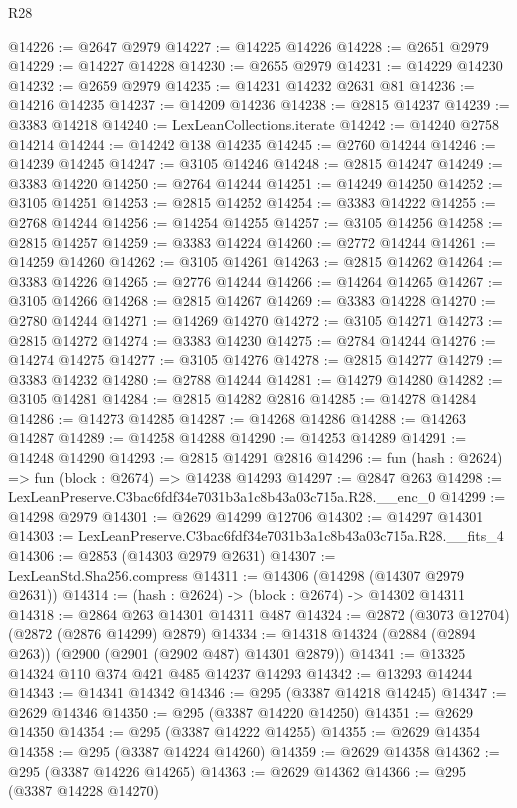 \begin{lexlean}{R28}
\begin{coremodule}
@14226 := @2647 @2979
@14227 := @14225 @14226
@14228 := @2651 @2979
@14229 := @14227 @14228
@14230 := @2655 @2979
@14231 := @14229 @14230
@14232 := @2659 @2979
@14235 := @14231 @14232 @2631 @81
@14236 := @14216 @14235
@14237 := @14209 @14236
@14238 := @2815 @14237
@14239 := @3383 @14218
@14240 := LexLeanCollections.iterate
@14242 := @14240 @2758 @14214
@14244 := @14242 @138 @14235
@14245 := @2760 @14244
@14246 := @14239 @14245
@14247 := @3105 @14246
@14248 := @2815 @14247
@14249 := @3383 @14220
@14250 := @2764 @14244
@14251 := @14249 @14250
@14252 := @3105 @14251
@14253 := @2815 @14252
@14254 := @3383 @14222
@14255 := @2768 @14244
@14256 := @14254 @14255
@14257 := @3105 @14256
@14258 := @2815 @14257
@14259 := @3383 @14224
@14260 := @2772 @14244
@14261 := @14259 @14260
@14262 := @3105 @14261
@14263 := @2815 @14262
@14264 := @3383 @14226
@14265 := @2776 @14244
@14266 := @14264 @14265
@14267 := @3105 @14266
@14268 := @2815 @14267
@14269 := @3383 @14228
@14270 := @2780 @14244
@14271 := @14269 @14270
@14272 := @3105 @14271
@14273 := @2815 @14272
@14274 := @3383 @14230
@14275 := @2784 @14244
@14276 := @14274 @14275
@14277 := @3105 @14276
@14278 := @2815 @14277
@14279 := @3383 @14232
@14280 := @2788 @14244
@14281 := @14279 @14280
@14282 := @3105 @14281
@14284 := @2815 @14282 @2816
@14285 := @14278 @14284
@14286 := @14273 @14285
@14287 := @14268 @14286
@14288 := @14263 @14287
@14289 := @14258 @14288
@14290 := @14253 @14289
@14291 := @14248 @14290
@14293 := @2815 @14291 @2816
@14296 := fun (hash : @2624) => fun (block : @2674) => @14238 @14293
@14297 := @2847 @263
@14298 := LexLeanPreserve.C3bac6fdf34e7031b3a1c8b43a03c715a.R28.__enc_0
@14299 := @14298 @2979
@14301 := @2629 @14299 @12706
@14302 := @14297 @14301
@14303 := LexLeanPreserve.C3bac6fdf34e7031b3a1c8b43a03c715a.R28.__fits_4
@14306 := @2853 (@14303 @2979 @2631)
@14307 := LexLeanStd.Sha256.compress
@14311 := @14306 (@14298 (@14307 @2979 @2631))
@14314 := (hash : @2624) -> (block : @2674) -> @14302 @14311
@14318 := @2864 @263 @14301 @14311 @487
@14324 := @2872 (@3073 @12704) (@2872 (@2876 @14299) @2879)
@14334 := @14318 @14324 (@2884 (@2894 @263)) (@2900 (@2901 (@2902 @487) @14301 @2879))
@14341 := @13325 @14324 @110 @374 @421 @485 @14237 @14293
@14342 := @13293 @14244
@14343 := @14341 @14342
@14346 := @295 (@3387 @14218 @14245)
@14347 := @2629 @14346
@14350 := @295 (@3387 @14220 @14250)
@14351 := @2629 @14350
@14354 := @295 (@3387 @14222 @14255)
@14355 := @2629 @14354
@14358 := @295 (@3387 @14224 @14260)
@14359 := @2629 @14358
@14362 := @295 (@3387 @14226 @14265)
@14363 := @2629 @14362
@14366 := @295 (@3387 @14228 @14270)

\end{coremodule}
\end{lexlean}
